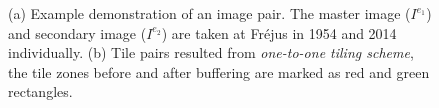 \begin{figure}[htbp]
	\begin{center}
		\caption{(a) Example demonstration of an image pair. The master image ($I^{e_1}$) and secondary image ($I^{e_2}$) are taken at Fr{\'e}jus in 1954 and 2014 individually. (b) Tile pairs resulted from \textit{one-to-one tiling scheme}, the tile zones before and after buffering are marked as red and green rectangles.}
		\label{patchexample}
	\end{center}
\end{figure}

